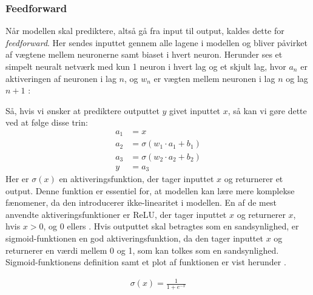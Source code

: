 \documentclass{article}
\begin{document}
\subsubsection{Feedforward}
Når modellen skal prediktere, altså gå fra input til output, kaldes dette for \textit{feedforward}. Her sendes inputtet gennem alle lagene i modellen og bliver påvirket af vægtene mellem neuronerne samt biaset i hvert neuron. Herunder ses et simpelt neuralt netværk med kun 1 neuron i hvert lag og et skjult lag, hvor $a_n$ er aktiveringen af neuronen i lag $n$, og $w_n$ er vægten mellem neuronen i lag $n$ og lag $n+1$ \parencite{sanderson2017neural}:
\begin{center}

\label{fig:neural_network2}
\end{center}
Så, hvis vi ønsker at prediktere outputtet $y$ givet inputtet $x$, så kan vi gøre dette ved at følge disse trin: \\
\begin{align}
a_1 &= x
\\
a_2 &= \sigma(w_1 \cdot a_1 + b_1)
\\
a_3 &= \sigma(w_2 \cdot a_2 + b_2)
\\
y &= a_3
\end{align}
Her er $\sigma(x)$ en aktiveringsfunktion, der tager inputtet $x$ og returnerer et output. Denne funktion er essentiel for, at modellen kan lære mere komplekse fænomener, da den introducerer ikke-linearitet i modellen. En af de mest anvendte aktiveringsfunktioner er ReLU, der tager inputtet $x$ og returnerer $x$, hvis $x > 0$, og 0 ellers \parencite{Sanderson_2017}. Hvis outputtet skal betragtes som en sandsynlighed, er sigmoid-funktionen en god aktiveringsfunktion, da den tager inputtet $x$ og returnerer en værdi mellem 0 og 1, som kan tolkes som en sandsynlighed. Sigmoid-funktionens definition samt et plot af funktionen er vist herunder \parencite{Nielsen_2019a}.\\
\begin{minipage}{0.4\textwidth}
  \begin{align}
    \sigma(x) = \frac{1}{1 + e^{-x}}
  \end{align}
\end{minipage}
\begin{minipage}{0.6\textwidth}
  \begin{center}
    \label{fig:sigmoid}
  \end{center}
\end{minipage}
\end{document}
